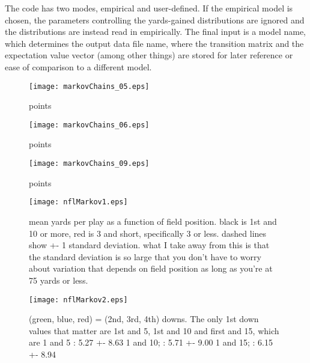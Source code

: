 \documentclass{article}
\begin{document}
The code has two modes, empirical and user-defined. If the empirical model is chosen, the parameters controlling the yards-gained distributions are ignored and the distributions are instead read in empirically. 
The final input is a model name, which determines the output data file name, where the transition matrix and the expectation value vector (among other things) are stored for later reference or ease of comparison to a different model.


\begin{figure} [!th] 
\begin{center}
\texttt{[image: markovChains\_05.eps]}
\end{center}
\caption{
points
 }
\label{fignm_05}
\end{figure}

\begin{figure} [!ht] 
\begin{center}
\texttt{[image: markovChains\_06.eps]}
\end{center}
\caption{
points
 }
\label{fignm_06}
\end{figure}

\begin{figure} [!ht] 
\begin{center}
\texttt{[image: markovChains\_09.eps]}
\end{center}
\caption{
points
 }
\label{fignm_09}
\end{figure}


\begin{figure} [!ht] 
\begin{center}
\texttt{[image: nflMarkov1.eps]}
\end{center}
\caption{
mean yards per play as a function of field position. black is 1st and 10 or more, red is 3 and short, specifically 3 or less. dashed lines show +- 1 standard deviation. what I take away from this is that the standard deviation is so large that you don’t have to worry about variation that depends on field position as long as you’re at 75 yards or less.
 }
\label{fignm1}
\end{figure}


\begin{figure} [!ht] 
\begin{center}
\texttt{[image: nflMarkov2.eps]}
\end{center}
\caption{
(green, blue, red) = (2nd, 3rd, 4th) downs. The only 1st down values that matter are 1st and 5, 1st and 10 and first and 15, which are
1 and 5 : 5.27 +- 8.63
1 and 10; : 5.71 +- 9.00
1 and 15; : 6.15 +- 8.94
 }
\label{fignm2}
\end{figure}
\end{document}
